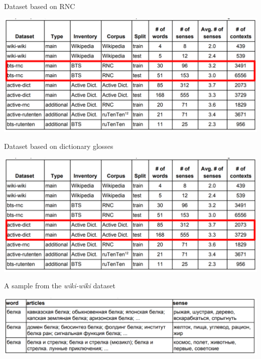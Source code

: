 \begin{frame}{Dataset based on RNC}

{\centering
\includegraphics[width=1.0\textwidth]{figures/datasets2}
}	
\end{frame}


\begin{frame}{Dataset based on dictionary glosses}

{\centering
\includegraphics[width=1.0\textwidth]{figures/datasets3}
}	
\end{frame}



\begin{frame}{A sample from the \textit{wiki-wiki} dataset }

{\centering
\includegraphics[width=1.0\textwidth]{figures/belka}
}	
\end{frame}



